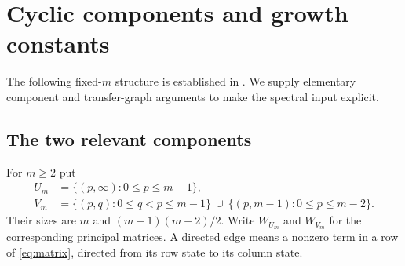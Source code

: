 \documentclass[11pt,a4paper]{article}
\theoremstyle{definition}\newaliascnt{definition}{theorem}
\theoremstyle{remark}\newaliascnt{remark}{theorem}
\begin{document}
\section{Cyclic components and growth constants}
\label{sec:components}
The following fixed-$m$ structure is established in
\cite[Proposition~2.7 and Theorem~4.12]{MayamaAkita}. We supply elementary
component and transfer-graph arguments to make the spectral input explicit.

\subsection{The two relevant components}
For $m\ge2$ put
\begin{align}
 U_m&=\{(p,\infty):0\le p\le m-1\},\label{eq:U}\\
 V_m&=\{(p,q):0\le q<p\le m-1\}
       \ \cup\ \{(p,m-1):0\le p\le m-2\}.
       \label{eq:V}
\end{align}
Their sizes are $m$ and $(m-1)(m+2)/2$. Write $W_{U_m}$ and $W_{V_m}$ for the
corresponding principal matrices. A directed edge means a nonzero term in a
row of \eqref{eq:matrix}, directed from its row state to its column state.
\end{document}
